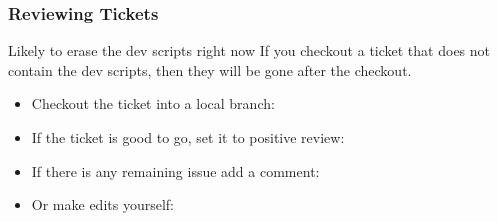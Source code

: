 \begin{frame}
  \frametitle{Reviewing Tickets}
  
  \begin{alertblock}{Likely to erase the dev scripts right now}
    If you checkout a ticket that does not contain the dev scripts,
    then they will be gone after the checkout.
  \end{alertblock}

  \begin{itemize}
  \item Checkout the ticket into a local branch:\\
  \item If the ticket is good to go, set it to positive review:\\
  \item If there is any remaining issue add a comment:\\
  \item Or make edits yourself:\\
    \\
  \end{itemize}
\end{frame}




